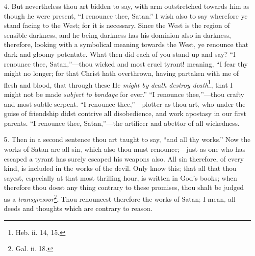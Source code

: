 4. But nevertheless thou art bidden to say, with arm outstretched towards him as though he were present, “I renounce thee, Satan.” I wish also to say wherefore ye stand facing to the West; for it is necessary. Since the West is the region of sensible darkness, and he being darkness has his dominion also in darkness, therefore, looking with a symbolical meaning towards the West, ye renounce that dark and gloomy potentate. What then did each of you stand up and say? “I renounce thee, Satan,”—thou wicked and most cruel tyrant! meaning, “I fear thy might no longer; for that Christ hath overthrown, having partaken with me of flesh and blood, that through these He \emph{might by death destroy death}\footnote{Heb. ii. 14, 15.}, that I might not be made \emph{subject to bondage} for ever.” “I renounce thee,”—thou crafty and most subtle serpent. “I renounce thee,”—plotter as thou art, who under the guise of friendship didst contrive all disobedience, and work apostasy in our first parents. “I renounce thee, Satan,”—the artificer and abettor of all wickedness.

5. Then in a second sentence thou art taught to say, “and all thy works.” Now the works of Satan are all sin, which also thou must renounce;—just as one who has escaped a tyrant has surely escaped his weapons also. All sin therefore, of every kind, is included in the works of the devil. Only know this; that all that thou sayest, especially at that most thrilling hour, is written in God’s books; when therefore thou doest any thing contrary to these promises, thou shalt be judged as a \emph{transgressor}\footnote{Gal. ii. 18.}. Thou renouncest therefore the works of Satan; I mean, all deeds and thoughts which are contrary to reason.

